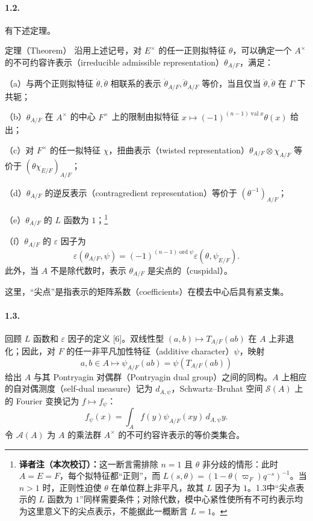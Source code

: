 \paragraph*{1.2.}有下述定理。
\begin{originaltheorem}{定理（Theorem）}
沿用上述记号，对 $E^\times$ 的任一正则拟特征 $\theta$，可以确定一个 $A^\times$ 的不可约容许表示（irreducible admissible representation）$\theta_{A/F}$，满足：

（a）与两个正则拟特征 $\dot\theta,\ddot\theta$ 相联系的表示 $\dot\theta_{A/F},\ddot\theta_{A/F}$ 等价，当且仅当 $\dot\theta,\ddot\theta$ 在 $\Gamma$ 下共轭；

（b）$\theta_{A/F}$ 在 $A^\times$ 的中心 $F^\times$ 上的限制由拟特征 $x\mapsto(-1)^{(n-1)\operatorname{val}x}\theta(x)$ 给出；

（c）对 $F^\times$ 的任一拟特征 $\chi$，扭曲表示（twisted representation）$\theta_{A/F}\otimes\chi_{A/F}$ 等价于 $(\theta\chi_{E/F})_{A/F}$；

（d）$\theta_{A/F}$ 的逆反表示（contragredient representation）等价于 $(\theta^{-1})_{A/F}$；

（e）$\theta_{A/F}$ 的 $L$ 函数为 $1$；\footnote{\textbf{译者注（本次校订）：}这一断言需排除 $n=1$ 且 $\theta$ 非分歧的情形：此时 $A=E=F$，每个拟特征都“正则”，而 $L(s,\theta)=(1-\theta(\varpi_F)q^{-s})^{-1}$。当 $n>1$ 时，正则性迫使 $\theta$ 在单位群上非平凡，故其 $L$ 因子为 $1$。1.3中“尖点表示的 $L$ 函数为 $1$”同样需要条件；对除代数，模中心紧性使所有不可约表示均为这里意义下的尖点表示，不能据此一概断言 $L=1$。}

（f）$\theta_{A/F}$ 的 $\varepsilon$ 因子为
\[
\varepsilon(\theta_{A/F},\psi)=(-1)^{(n-1)\operatorname{ord}\psi}\varepsilon(\theta,\psi_{E/F}).
\]
此外，当 $A$ 不是除代数时，表示 $\theta_{A/F}$ 是尖点的（cuspidal）。
\end{originaltheorem}
这里，“尖点”是指表示的矩阵系数（coefficients）在模去中心后具有紧支集。
\paragraph*{1.3.}回顾 $L$ 函数和 $\varepsilon$ 因子的定义 [6]。双线性型 $(a,b)\mapsto T_{A/F}(ab)$ 在 $A$ 上非退化；因此，对 $F$ 的任一非平凡加性特征（additive character）$\psi$，映射
\[
a,b\in A\longmapsto\psi_{A/F}(ab)=\psi(T_{A/F}(ab))
\]
给出 $A$ 与其 Pontryagin 对偶群（Pontryagin dual group）之间的同构。$A$ 上相应的自对偶测度（self-dual measure）记为 $d_{A,\psi}$，Schwartz--Bruhat 空间 $\mathcal S(A)$ 上的 Fourier 变换记为 $f\mapsto f_\psi$：
\[
f_\psi(x)=\int_A f(y)\psi_{A/F}(xy)\,d_{A,\psi}y.
\]
令 $\mathcal A(A)$ 为 $A$ 的乘法群 $A^\times$ 的不可约容许表示的等价类集合。

